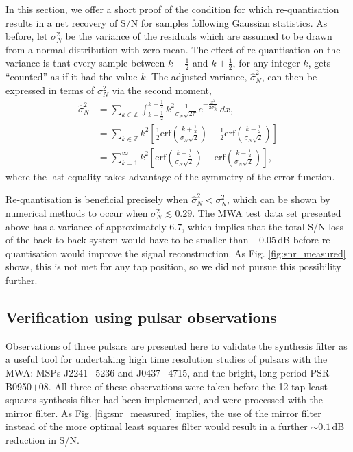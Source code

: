 \documentclass{pasa}%
\newcommand{\psrslowB}{B0950$+$08}
\newcommand{\psrkaurJ}{J2241$-$5236}
\newcommand{\psrbhatJ}{J0437$-$4715}
\begin{document}
In this section, we offer a short proof of the condition for which re-quantisation results in a net recovery of S/N for samples following Gaussian statistics.
As before, let $\sigma_N^2$ be the variance of the residuals which are assumed to be drawn from a normal distribution with zero mean.
The effect of re-quantisation on the variance is that every sample between $k-\frac12$ and $k+\frac12$, for any integer $k$, gets ``counted'' as if it had the value $k$.
The adjusted variance, $\hat{\sigma}_N^2$, can then be expressed in terms of $\sigma_N^2$ via the second moment,
\begin{equation}
    \begin{aligned}
        \hat{\sigma}_N^2
         &= \sum_{k \in \mathbb{Z}} \int_{k-\frac12}^{k+\frac12} k^2
            \frac{1}{\sigma_N\sqrt{2\pi}} e^{-\frac{x^2}{2\sigma_N^2}}\,dx, \\
         &= \sum_{k \in \mathbb{Z}} k^2
            \left[\frac12\text{erf}\left(\frac{k+\frac12}{\sigma_N\sqrt{2}}\right) -
            \frac12\text{erf}\left(\frac{k-\frac12}{\sigma_N\sqrt{2}}\right)\right] \\
         &= \sum_{k=1}^{\infty} k^2
            \left[\text{erf}\left(\frac{k+\frac12}{\sigma_N\sqrt{2}}\right) -
            \text{erf}\left(\frac{k-\frac12}{\sigma_N\sqrt{2}}\right)\right],
    \end{aligned}
\end{equation}
where the last equality takes advantage of the symmetry of the error function.

Re-quantisation is beneficial precisely when $\hat{\sigma}_N^2 < \sigma_N^2$, which can be shown by numerical methods to occur when $\sigma_N^2 \lesssim 0.29$.
The MWA test data set presented above has a variance of approximately $6.7$, which implies that the total S/N loss of the back-to-back system would have to be smaller than $-0.05\,$dB before re-quantisation would improve the signal reconstruction.
As Fig. \ref{fig:snr_measured} shows, this is not met for any tap position, so we did not pursue this possibility further.

\subsection{Verification using pulsar observations}
\label{sec:pulsardata}

Observations of three pulsars are presented here to validate the synthesis filter as a useful tool for undertaking high time resolution studies of pulsars with the MWA: MSPs \psrkaurJ{} and \psrbhatJ{}, and the bright, long-period PSR \psrslowB{}.
All three of these observations were taken before the 12-tap least squares synthesis filter had been implemented, and were processed with the mirror filter.
As Fig. \ref{fig:snr_measured} implies, the use of the mirror filter instead of the more optimal least squares filter would result in a further $\sim 0.1\,$dB reduction in S/N.
\end{document}
